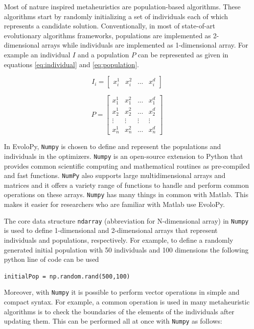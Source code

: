 \documentclass[a4paper,twoside]{article}
\begin{document}
Most of nature inspired metaheuristics are population-based algorithms. These algorithms start by randomly initializing a set of individuals each of which represents a candidate solution. Conventionally, in most of state-of-art evolutionary algorithms frameworks, populations are implemented as 2-dimensional arrays while individuals are implemented as 1-dimensional array. For example an individual $I$ and a population $P$ can be represented as given in equations \ref{eq:individual} and \ref{eq:population}.

\begin{equation}
I_{i}=[\begin{array}{cccc}
x_{i}^{1} & x_{i}^{2} & ... & x_{i}^{d}\end{array}]
\label{eq:individual}
\end{equation}

\begin{equation}
P=\left[\begin{array}{cccc}
x_{1}^{1} & x_{1}^{2} & ... & x_{1}^{d}\\
x_{2}^{1} & x_{2}^{2} & ... & x_{2}^{d}\\
\vdots & \vdots & \vdots & \vdots\\
x_{n}^{1} & x_{n}^{2} & ... & x_{n}^{d}
\end{array}\right]
\label{eq:population}
\end{equation}

In EvoloPy, \texttt{Numpy} is chosen to define and represent the populations and individuals in the optimizers. \texttt{Numpy} is an open-source extension to Python that provides common scientific computing and mathematical routines as pre-compiled and fast functions. \texttt{NumPy} also supports large multidimensional arrays and matrices and it offers a variety range of functions to handle and perform common operations on these arrays. \texttt{Numpy} has many things in common with Matlab. This makes it easier for researchers who are familiar with Matlab use EvoloPy. 

The core data structure \texttt{ndarray} (abbreviation for N-dimensional array) in \texttt{Numpy} is used to define 1-dimensional and 2-dimensional arrays that represent individuals and populations, respectively. For example, to define a randomly generated initial population with 50 individuals and 100 dimensions the following python line of code can be used

\texttt{initialPop = np.random.rand(500,100)}


Moreover, with \texttt{Numpy} it is possible to perform vector operations in simple and compact syntax. For example, a common operation is used in many metaheuristic algorithms is to check the boundaries of the elements of the individuals after updating them. This can be performed all at once with \texttt{Numpy} as follows:
\end{document}

